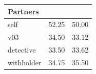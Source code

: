 \begin{tabular}{lrr}
\toprule
Partners & \vsix{} & \vfive{} \\
\midrule
self & 52.25 & 50.00 \\
v03 & 34.50 & 33.12 \\
detective & 33.50 & 33.62 \\
withholder & 34.75 & 35.50 \\
\bottomrule
\end{tabular}
